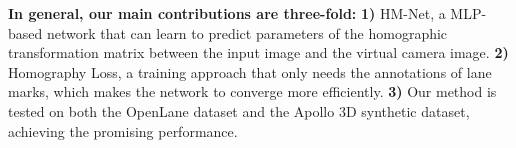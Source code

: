 \textbf{In general, our main contributions are three-fold:}
\textbf{1)} HM-Net, a MLP-based network that can learn to predict parameters of the homographic transformation matrix between the input image and the virtual camera image.
\textbf{2)} Homography Loss, a training approach that only needs the annotations of lane marks, which makes the network to converge more efficiently.
\textbf{3)} Our method is tested on both the OpenLane dataset and the Apollo 3D synthetic dataset, achieving the promising performance. %